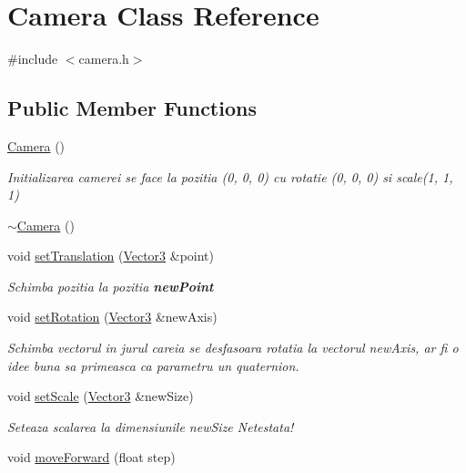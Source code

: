 \hypertarget{class_camera}{\section{Camera Class Reference}
\label{class_camera}
}


{\ttfamily \#include $<$camera.\-h$>$}

\subsection*{Public Member Functions}
\begin{DoxyCompactItemize}
\item 
\hyperlink{class_camera_a01f94c3543f56ede7af49dc778f19331}{Camera} ()
\begin{DoxyCompactList}\small\item\em Initializarea camerei se face la pozitia (0, 0, 0) cu rotatie (0, 0, 0) si scale(1, 1, 1) \end{DoxyCompactList}\item 
\hyperlink{class_camera_ad1897942d0ccf91052386388a497349f}{$\sim$\-Camera} ()
\item 
void \hyperlink{class_camera_a73ccd8097845e13876fc693c5e614d90}{set\-Translation} (\hyperlink{struct_vector3}{Vector3} \&point)
\begin{DoxyCompactList}\small\item\em Schimba pozitia la pozitia {\bfseries new\-Point} \end{DoxyCompactList}\item 
void \hyperlink{class_camera_aba9df9fb2129b591d26bb5419318355d}{set\-Rotation} (\hyperlink{struct_vector3}{Vector3} \&new\-Axis)
\begin{DoxyCompactList}\small\item\em Schimba vectorul in jurul careia se desfasoara rotatia la vectorul new\-Axis, ar fi o idee buna sa primeasca ca parametru un quaternion. \end{DoxyCompactList}\item 
void \hyperlink{class_camera_ac6edf32fdd18fbd064255beefc9ceca2}{set\-Scale} (\hyperlink{struct_vector3}{Vector3} \&new\-Size)
\begin{DoxyCompactList}\small\item\em Seteaza scalarea la dimensiunile new\-Size  Netestata! \end{DoxyCompactList}\item 
void \hyperlink{class_camera_a8d10ea5b8790919325234395c7b04a6f}{move\-Forward} (float step)

\end{DoxyCompactItemize}
